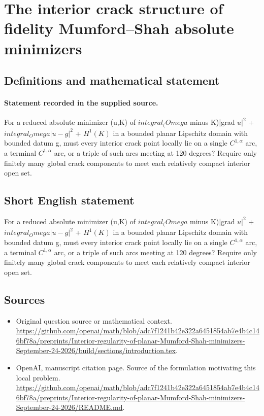 \documentclass[11pt]{article}
\begin{document}
\section*{The interior crack structure of fidelity Mumford–Shah absolute minimizers}\label{30007322}
\subsection{Definitions and mathematical statement}
\paragraph{Statement recorded in the supplied source.}
For a reduced absolute minimizer (u,K) of $integral_(Omega$ minus K)|grad $u|^2$ + $integral_Omega|u-g|^2$ + $H^1(K)$ in a bounded planar Lipschitz domain with bounded datum g, must every interior crack point locally lie on a single $C^{1,\alpha }$ arc, a terminal $C^{1,\alpha }$ arc, or a triple of such arcs meeting at 120 degrees? Require only finitely many global crack components to meet each relatively compact interior open set.
\subsection{Short English statement}
For a reduced absolute minimizer (u,K) of $integral_(Omega$ minus K)|grad $u|^2$ + $integral_Omega|u-g|^2$ + $H^1(K)$ in a bounded planar Lipschitz domain with bounded datum g, must every interior crack point locally lie on a single $C^{1,\alpha }$ arc, a terminal $C^{1,\alpha }$ arc, or a triple of such arcs meeting at 120 degrees? Require only finitely many global crack components to meet each relatively compact interior open set.
\subsection{Sources}
\begin{itemize}
\item[S1] Original question source or mathematical context.
\url{https://github.com/openai/math/blob/adc7f1241b42e322a6451854ab7e4b4c146bf78a/preprints/Interior-regularity-of-planar-Mumford-Shah-minimizers-September-24-2026/build/sections/introduction.tex}.
\item[S2] OpenAI, manuscript citation page. Source of the formulation motivating this local problem.
\url{https://github.com/openai/math/blob/adc7f1241b42e322a6451854ab7e4b4c146bf78a/preprints/Interior-regularity-of-planar-Mumford-Shah-minimizers-September-24-2026/README.md}.
\end{itemize}
\end{document}
